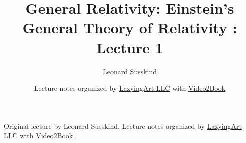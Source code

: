 \documentclass[11pt,oneside]{book}
\begin{document}
\frontmatter
\title{General Relativity: Einstein's General Theory of Relativity : Lecture 1}
\author{Leonard Susskind}
\date{Lecture notes organized by \href{https://lazying.art}{LazyingArt LLC} with \href{https://github.com/lachlanchen/Video2Book}{Video2Book}}
\maketitle
\begin{center}
\small Original lecture by Leonard Susskind. Lecture notes organized by \href{https://lazying.art}{LazyingArt LLC} with \href{https://github.com/lachlanchen/Video2Book}{Video2Book}.
\end{center}
\clearpage
\mainmatter

\end{document}
